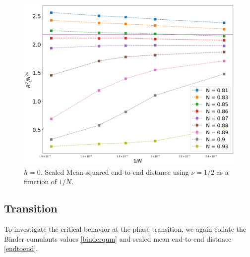  \begin{figure}[H]
	\centering
	\includegraphics[scale=0.32]{Images/rscaling_longchainscross_3D.png} 
	\caption{$h=0$. Scaled Mean-squared end-to-end distance using $\nu=1/2$ as a function of $1/N$.   }
	\label{fig:Rscaled3D}
\end{figure}

\subsection{Transition}\label{Transition_3D}

To investigate the critical behavior at the phase transition, we again collate the Binder cumulants values \eqref{binderqum} and scaled mean end-to-end distance  \eqref{endtoend}.


